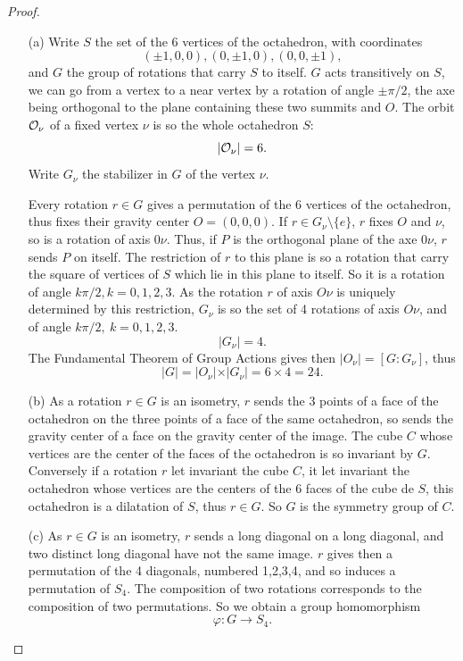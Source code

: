 \documentclass[11pt,a4paper]{article}
\begin{document}
\begin{proof}
\begin{enumerate}
\item[(a)]
Write  $S$ the set of the  6 vertices of the octahedron, with coordinates $$(\pm1,0,0),(0,\pm1,0),(0,0,\pm1),$$ and $G$ the group of rotations that carry $S$ to itself.
$G$ acts transitively on $S$, we can go from a vertex to a  near vertex by a rotation of angle $\pm \pi/2$, the axe being orthogonal to the plane containing these two summits and  $O$. The orbit ${\cal O}_{\nu}$ of a fixed vertex  $\nu$ is so the whole octahedron $S$: 
$$\vert  {\cal O}_\nu \vert = 6.$$
Write $G_\nu$ the stabilizer in  $G$ of the vertex $\nu$.

Every rotation $r \in G$ gives a permutation  of the 6 vertices of the octahedron, thus fixes their gravity center $O = (0,0,0)$. If $r \in G_\nu\setminus\{e\}$, $r$ fixes $O$ and $\nu$, so is a rotation of axis $0\nu$. Thus, if $P$ is the orthogonal plane of the axe $0 \nu$, $r$ sends $P$ on itself. The restriction of $r$ to this plane is so a rotation that carry the square of vertices of $S$ which lie in this plane to itself. So it is a rotation of angle $k\pi/2, k=0,1,2,3$. As the rotation $r$ of axis $O\nu$ is  uniquely determined by this restriction, $G_\nu$ is so the set of 4 rotations of axis $O\nu$, and of angle $k \pi/2,\  k = 0,1,2,3$.
$$\vert G_\nu \vert = 4.$$
The Fundamental Theorem of Group Actions gives then $\vert O_\nu \vert = [G:G_\nu]$, thus
$$\vert G \vert = \vert O_\nu \vert \times \vert G_\nu \vert = 6 \times 4 = 24.$$

\item[(b)]
As a rotation $r \in G$ is an isometry, $r$ sends the 3 points of a face of the octahedron on the three points of a face of the same octahedron, so sends the gravity center of a face on the gravity center of the image. The cube $C$ whose vertices are the center of the faces of the octahedron is so invariant by $G$. Conversely if a rotation $r$ let invariant the cube $C$, it let invariant the octahedron whose vertices are the centers of the 6 faces of the cube de $S$, this octahedron is a dilatation of $S$, thus $r \in G$. So $G$ is the symmetry group of $C$. 


\item[(c)]
As $r \in G$ is an isometry, $r$ sends a long diagonal on a long diagonal, and two distinct long diagonal have not the same image. $r$ gives then a permutation of the 4 diagonals, numbered 1,2,3,4, and so induces a permutation of $S_4$. The composition of two rotations corresponds  to the composition of two permutations. So we obtain a group homomorphism
$$\varphi : G \to S_4.$$


\end{enumerate}
\end{proof}
\end{document}
